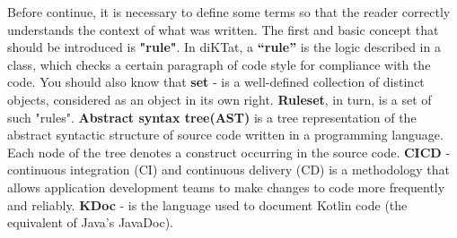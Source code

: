 Before continue, it is necessary to define some terms so that the reader correctly understands the context of what was written. 
The first and basic concept that should be introduced is \textbf{"rule"}. In diKTat, a \textbf{“rule”} is the logic described in a class, which checks a certain paragraph of code style for compliance with the code.
 You should also know that \textbf{set} -  is a well-defined collection of distinct objects, considered as an object in its own right. 
 \textbf{Ruleset}, in turn, is a set of such "rules". 
 \textbf{Abstract syntax tree(AST)} is a tree representation of the abstract syntactic structure of source code written in a programming language. Each node of the tree denotes a construct occurring in the source code.
 \textbf{CICD} - continuous integration (CI) and continuous delivery (CD) is a methodology that allows application development teams to make changes to code more frequently and reliably.
 \textbf{KDoc} - is the language used to document Kotlin code (the equivalent of Java's JavaDoc).